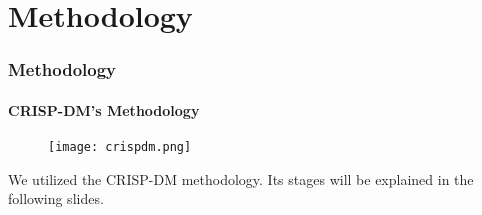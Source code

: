 \section{Methodology}

\begin{frame}
	\frametitle{Methodology}
	\framesubtitle{CRISP-DM's Methodology}	
	\begin{figure}
		\texttt{[image: crispdm.png]}
	\end{figure}

	\begin{block}{}
	\scriptsize
		We utilized the CRISP-DM methodology. Its stages will be explained in the following slides.	
	\end{block}	
\end{frame}

